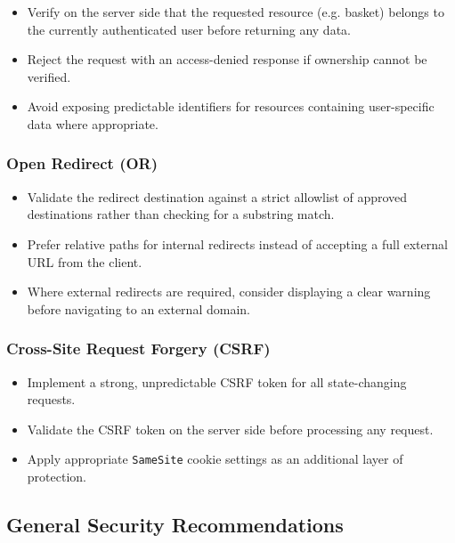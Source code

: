\begin{itemize}
    \item Verify on the server side that the requested resource
    (e.g. basket) belongs to the currently authenticated user before
    returning any data.

    \item Reject the request with an access-denied response if
    ownership cannot be verified.

    \item Avoid exposing predictable identifiers for resources
    containing user-specific data where appropriate.
\end{itemize}

\subsubsection*{Open Redirect (OR)}

\begin{itemize}
    \item Validate the redirect destination against a strict allowlist
    of approved destinations rather than checking for a substring
    match.

    \item Prefer relative paths for internal redirects instead of
    accepting a full external URL from the client.

    \item Where external redirects are required, consider displaying
    a clear warning before navigating to an external domain.
\end{itemize}

\subsubsection*{Cross-Site Request Forgery (CSRF)}

\begin{itemize}
    \item Implement a strong, unpredictable CSRF token for all
    state-changing requests.

    \item Validate the CSRF token on the server side before processing
    any request.

    \item Apply appropriate \texttt{SameSite} cookie settings as an
    additional layer of protection.
\end{itemize}

\subsection*{General Security Recommendations}

